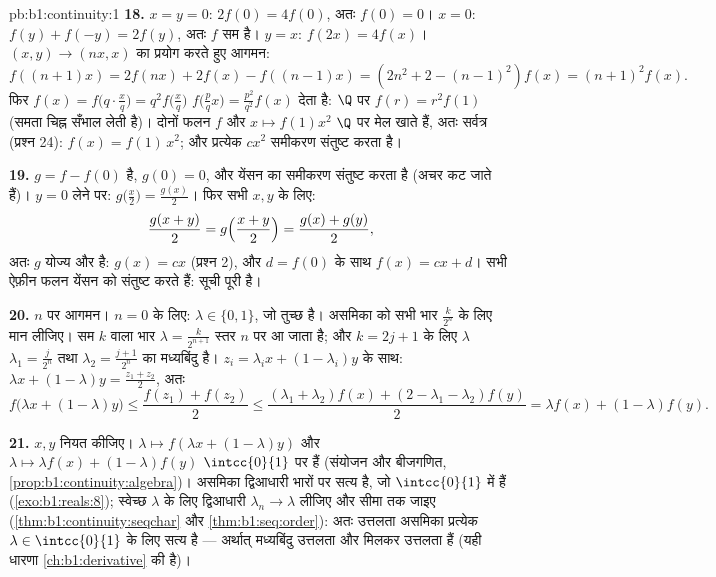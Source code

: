 \begin{solution}{pb:b1:continuity:1}
\textbf{18.} $x = y = 0$: $2f(0) = 4f(0)$, अतः $f(0) = 0$। $x = 0$: $f(y) +
f(-y) = 2f(y)$, अतः $f$ सम है। $y = x$: $f(2x) = 4f(x)$। $(x, y) \to (nx,
x)$ का प्रयोग करते हुए आगमन:
\[
f((n{+}1)x) = 2f(nx) + 2f(x) - f((n{-}1)x)
= (2n^2 + 2 - (n-1)^2) f(x) = (n+1)^2 f(x) .
\]
फिर $f(x) = f\bigl(q\cdot\frac xq\bigr) = q^2 f\bigl(\frac xq\bigr)$
$f\bigl(\frac pq x\bigr) = \frac{p^2}{q^2}f(x)$ देता है: $\Q$ पर $f(r) = r^2
f(1)$ (समता चिह्न सँभाल लेती है)। दोनों  फलन $f$ और $x \mapsto f(1)x^2$
  $\Q$ पर मेल खाते हैं, अतः सर्वत्र (प्रश्न 24): $f(x) =
f(1)\,x^2$; और प्रत्येक $cx^2$ समीकरण संतुष्ट करता है।

\textbf{19.} $g = f - f(0)$  है, $g(0) = 0$, और येंसन का समीकरण संतुष्ट
करता है (अचर कट जाते हैं)। $y = 0$ लेने पर: $g\bigl(\frac x2\bigr) =
\frac{g(x)}{2}$। फिर सभी $x, y$ के लिए:
\[
\frac{g(x + y)}{2} = g\Bigl(\frac{x+y}{2}\Bigr)
= \frac{g(x) + g(y)}{2} ,
\]
अतः $g$ योज्य और  है: $g(x) = cx$ (प्रश्न 2), और $d = f(0)$ के साथ $f(x)
= cx + d$। सभी ऐफ़ीन फलन येंसन को संतुष्ट करते हैं: सूची पूरी है।

\textbf{20.} $n$ पर आगमन। $n = 0$ के लिए: $\lambda \in \{0, 1\}$, जो तुच्छ
है। असमिका को सभी भार $\frac{k}{2^n}$ के लिए मान लीजिए। सम $k$ वाला भार
$\lambda = \frac{k}{2^{n+1}}$ स्तर $n$ पर आ जाता है; और $k = 2j + 1$ के लिए
$\lambda$ $\lambda_1 = \frac{j}{2^n}$ तथा $\lambda_2 = \frac{j+1}{2^n}$ का
मध्यबिंदु है। $z_i = \lambda_i x + (1 - \lambda_i)y$ के साथ: $\lambda x +
(1-\lambda)y = \frac{z_1 + z_2}{2}$, अतः
\[
f\bigl(\lambda x + (1{-}\lambda)y\bigr)
\leq \frac{f(z_1) + f(z_2)}{2}
\leq \frac{(\lambda_1 + \lambda_2)f(x) + (2 - \lambda_1 -
\lambda_2)f(y)}{2}
= \lambda f(x) + (1 - \lambda)f(y) .
\]

\textbf{21.} $x, y$ नियत कीजिए।  $\lambda \mapsto f(\lambda x +
(1 - \lambda)y)$ और $\lambda \mapsto \lambda f(x) + (1 - \lambda)f(y)$
$\intcc{0}{1}$ पर  हैं (संयोजन और बीजगणित,
\cref{prop:b1:continuity:algebra})। असमिका द्विआधारी भारों पर सत्य है, जो
$\intcc{0}{1}$ में  हैं (\cref{exo:b1:reals:8}); स्वेच्छ $\lambda$ के लिए
द्विआधारी $\lambda_n \to \lambda$ लीजिए और सीमा तक जाइए
(\cref{thm:b1:continuity:seqchar} और \cref{thm:b1:seq:order}): अतः उत्तलता
असमिका प्रत्येक $\lambda \in \intcc{0}{1}$ के लिए सत्य है --- अर्थात्
मध्यबिंदु उत्तलता और  मिलकर उत्तलता हैं (यही धारणा
\cref{ch:b1:derivative} की है)।


\end{solution}
